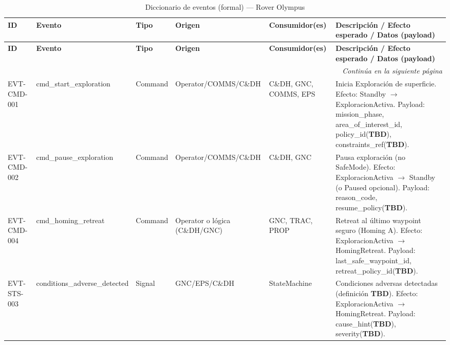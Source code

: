 \begin{landscape}
\scriptsize
\renewcommand{\arraystretch}{1.15}
\setlength{\tabcolsep}{3pt}

\begin{longtable}{|p{2.0cm}|p{3.5cm}|p{1.4cm}|p{2.8cm}|p{3.2cm}|p{8.5cm}|}
\caption{Diccionario de eventos (formal) — Rover Olympus}\label{tab:diccionario_eventos}\\
\hline
\textbf{ID} & \textbf{Evento} & \textbf{Tipo} & \textbf{Origen} & \textbf{Consumidor(es)} & \textbf{Descripción / Efecto esperado / Datos (payload)} \\
\hline
\endfirsthead

\hline
\textbf{ID} & \textbf{Evento} & \textbf{Tipo} & \textbf{Origen} & \textbf{Consumidor(es)} & \textbf{Descripción / Efecto esperado / Datos (payload)} \\
\hline
\endhead

\hline
\multicolumn{6}{r}{\textit{Continúa en la siguiente página}}\\
\endfoot

\hline
\endlastfoot

EVT-CMD-001 & cmd\_start\_exploration & Command & Operator/\allowbreak COMMS/\allowbreak C\&DH & C\&DH, GNC, COMMS, EPS & 
Inicia Exploración de superficie. Efecto: Standby $\rightarrow$ ExploracionActiva. 
Payload: mission\_phase, area\_of\_interest\_id, policy\_id(\textbf{TBD}), constraints\_ref(\textbf{TBD}). \\
\hline

EVT-CMD-002 & cmd\_pause\_exploration & Command & Operator/\allowbreak COMMS/\allowbreak C\&DH & C\&DH, GNC &
Pausa exploración (no SafeMode). Efecto: ExploracionActiva $\rightarrow$ Standby (o Paused opcional). 
Payload: reason\_code, resume\_policy(\textbf{TBD}). \\
\hline

EVT-CMD-004 & cmd\_homing\_retreat & Command & Operator o lógica (C\&DH/GNC) & GNC, TRAC, PROP &
Retreat al último waypoint seguro (Homing A). Efecto: ExploracionActiva $\rightarrow$ HomingRetreat.
Payload: last\_safe\_waypoint\_id, retreat\_policy\_id(\textbf{TBD}). \\
\hline

EVT-STS-003 & conditions\_adverse\_detected & Signal & GNC/EPS/C\&DH & StateMachine &
Condiciones adversas detectadas (definición \textbf{TBD}). Efecto: ExploracionActiva $\rightarrow$ HomingRetreat.
Payload: cause\_hint(\textbf{TBD}), severity(\textbf{TBD}). \\
\hline


\end{longtable}
\end{landscape}
